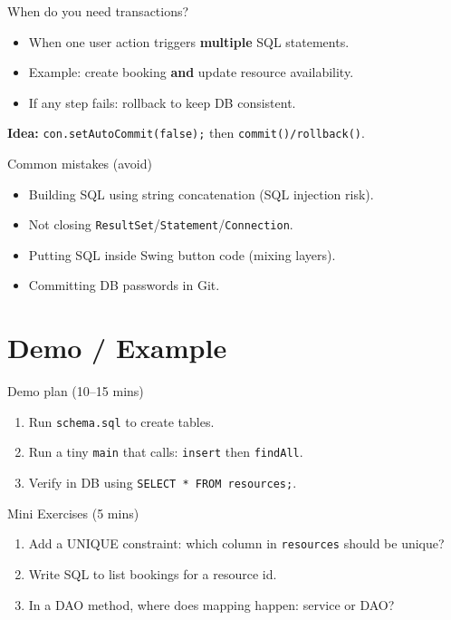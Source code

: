 \documentclass{beamer}
\begin{document}
\begin{frame}{When do you need transactions?}
  \begin{itemize}[<+->]
    \item When one user action triggers \textbf{multiple} SQL statements.
    \item Example: create booking \textbf{and} update resource availability.
    \item If any step fails: rollback to keep DB consistent.
  \end{itemize}
  \vspace{0.6em}
  \textbf{Idea:} \texttt{con.setAutoCommit(false);} then \texttt{commit()/rollback()}.
  \slidesources{\OOPSUnitVISources}
\end{frame}

\begin{frame}{Common mistakes (avoid)}
  \begin{itemize}[<+->]
    \item Building SQL using string concatenation (SQL injection risk).
    \item Not closing \texttt{ResultSet}/\texttt{Statement}/\texttt{Connection}.
    \item Putting SQL inside Swing button code (mixing layers).
    \item Committing DB passwords in Git.
  \end{itemize}
  \slidesources{\OOPSUnitVISources}
\end{frame}

\section{Demo / Example}
\label{sec:demo}

\begin{frame}{Demo plan (10--15 mins)}
  \begin{enumerate}[<+->]
    \item Run \texttt{schema.sql} to create tables.
    \item Run a tiny \texttt{main} that calls: \texttt{insert} then \texttt{findAll}.
    \item Verify in DB using \texttt{SELECT * FROM resources;}.
  \end{enumerate}
  \slidesources{\OOPSUnitVISources}
\end{frame}

\begin{frame}{Mini Exercises (5 mins)}
  \begin{enumerate}[<+->]
    \item Add a UNIQUE constraint: which column in \texttt{resources} should be unique?
    \item Write SQL to list bookings for a resource id.
    \item In a DAO method, where does mapping happen: service or DAO?
  \end{enumerate}
  \slidesources{\OOPSUnitVISources}
\end{frame}
\end{document}
